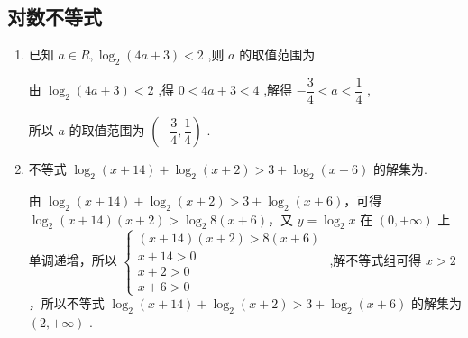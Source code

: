     \subsection*{对数不等式}
    \begin{enumerate}
        \item 已知 $a \in  R,{\log }_{2}\left( {{4a} + 3}\right)  < 2$ ,则 $a$ 的取值范围为
        \begin{jieda}
            由 ${\log }_{2}\left( {{4a} + 3}\right)  < 2$ ,得 $0 < {4a} + 3 < 4$ ,解得 $- \dfrac{3}{4} < a < \dfrac{1}{4}$ ,
            
            所以 $a$ 的取值范围为 $\left( {-\dfrac{3}{4},\dfrac{1}{4}}\right)$ .
        \end{jieda}   
        \item 不等式 ${\log }_{2}\left( {x + {14}}\right)  + {\log }_{2}\left( {x + 2}\right)  > 3 + {\log }_{2}\left( {x + 6}\right)$ 的解集为.
        \begin{jieda}
            由 ${\log }_{2}\left( {x + {14}}\right)  + {\log }_{2}\left( {x + 2}\right)  > 3 + {\log }_{2}\left( {x + 6}\right)$，可得 ${\log }_{2}\left( {x + {14}}\right) \left( {x + 2}\right)  > {\log }_{2}8\left( {x + 6}\right)$，又 $y = {\log }_{2}x$ 在 $\left( {0, + \infty }\right)$ 上单调递增，所以 $\left\{  \begin{array}{l} \left( {x + {14}}\right) \left( {x + 2}\right)  > 8\left( {x + 6}\right) \\  x + {14} > 0 \\  x + 2 > 0 \\  x + 6 > 0 \end{array}\right.$ ,解不等式组可得 $x > 2$，所以不等式 ${\log }_{2}\left( {x + {14}}\right)  + {\log }_{2}\left( {x + 2}\right)  > 3 + {\log }_{2}\left( {x + 6}\right)$ 的解集为 $\left( {2, + \infty }\right)$ .
        \end{jieda}
    \end{enumerate}
